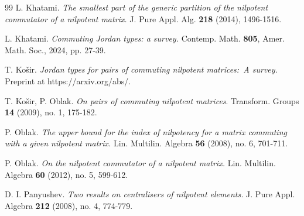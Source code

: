 \documentclass[11pt]{amsproc}
\begin{document}
\begin{thebibliography}{99}
L. Khatami. 
\emph{The smallest part of the generic partition of the nilpotent commutator of a nilpotent matrix.} J. Pure Appl. Alg. \textbf{218} (2014), 1496-1516.

L. Khatami.
\emph{Commuting Jordan types: a survey.}
Contemp. Math. \textbf{ 805},
Amer. Math. Soc., 2024, pp. 27-39.

T. Ko\v{s}ir.
\emph{Jordan types for pairs of commuting nilpotent matrices:~A survey.}
Preprint at https://arxiv.org/abs/.

T. Ko\v sir, P. Oblak. 
\emph{On pairs of commuting nilpotent matrices}. Transform. Groups \textbf{14} (2009), no. 1, 175-182.

P. Oblak. 
\emph{The upper bound for the index of nilpotency for a matrix commuting with
a given nilpotent matrix.} Lin. Multilin. Algebra \textbf{56} (2008), no. 6, 701-711.

P. Oblak. 
\emph{On the nilpotent commutator of a nilpotent matrix.} Lin. Multilin. Algebra
\textbf{60} (2012), no. 5, 599-612.

D. I. Panyushev. 
\emph{Two results on centralisers of nilpotent elements.} J. Pure Appl.
Algebra \textbf{212} (2008), no. 4, 774-779.

\end{thebibliography}
\end{document}
